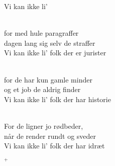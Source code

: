 \begin{song}{Vi kan ikke li'}
 \begin{SBVerse}
    \\
    for med hule paragraffer\\
    dagen lang sig selv de straffer\\
    Vi kan ikke li' folk der er jurister
  \end{SBVerse}

 \begin{SBVerse}
    \\
    for de har kun gamle minder\\
    og et job de aldrig finder\\
    Vi kan ikke li' folk der har historie
  \end{SBVerse}

 \begin{SBVerse}
    \\
    For de ligner jo rødbeder,\\
    når de render rundt og sveder\\
    Vi kan ikke li' folk der har idræt
  \end{SBVerse}

 \begin{SBVerse}
    $^+$
  \end{SBVerse}
\end{song}
